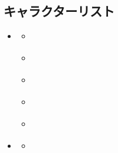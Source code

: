 \documentclass[letterpaper,10pt,dvipdfmx]{sphinxmanual}
\begin{document}
\subsection{キャラクターリスト}
\label{\detokenize{auto/actionlist:id42}}
\begin{sphinxShadowBox}
\begin{itemize}
\item {} 
\sphinxAtStartPar
{}\label{\detokenize{auto/actionlist:id100}}{\hyperref[\detokenize{auto/actionlist:id44}]{}}
\begin{itemize}
\item {} 
\sphinxAtStartPar
{}\label{\detokenize{auto/actionlist:id101}}{\hyperref[\detokenize{auto/actionlist:char-soldier}]{}}

\item {} 
\sphinxAtStartPar
{}\label{\detokenize{auto/actionlist:id102}}{\hyperref[\detokenize{auto/actionlist:char-hero}]{}}

\item {} 
\sphinxAtStartPar
{}\label{\detokenize{auto/actionlist:id103}}{\hyperref[\detokenize{auto/actionlist:char-ace}]{}}

\item {} 
\sphinxAtStartPar
{}\label{\detokenize{auto/actionlist:id104}}{\hyperref[\detokenize{auto/actionlist:char-magician}]{}}

\item {} 
\sphinxAtStartPar
{}\label{\detokenize{auto/actionlist:id105}}{\hyperref[\detokenize{auto/actionlist:char-armedsoldier}]{}}

\end{itemize}

\item {} 
\sphinxAtStartPar
{}\label{\detokenize{auto/actionlist:id106}}{\hyperref[\detokenize{auto/actionlist:id50}]{}}
\begin{itemize}
\item {} 
\sphinxAtStartPar
{}\label{\detokenize{auto/actionlist:id107}}{\hyperref[\detokenize{auto/actionlist:char-bulwark}]{}}

\end{itemize}

\end{itemize}
\end{sphinxShadowBox}
\end{document}
